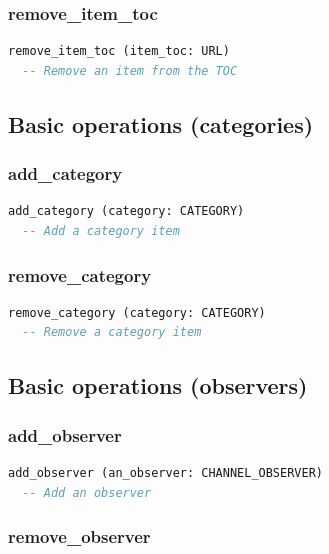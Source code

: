 \subsubsection{remove\_item\_toc}

\begin{lstlisting}[language=Eiffel]
remove_item_toc (item_toc: URL)
  -- Remove an item from the TOC
\end{lstlisting}

\subsection{Basic operations (categories)}
\label{sec:channel-basic-operations-categories}

\subsubsection{add\_category}

\begin{lstlisting}[language=Eiffel]
add_category (category: CATEGORY)
  -- Add a category item
\end{lstlisting}

\subsubsection{remove\_category}

\begin{lstlisting}[language=Eiffel]
remove_category (category: CATEGORY)
  -- Remove a category item
\end{lstlisting}

\subsection{Basic operations (observers)}
\label{sec:channel-basic-operations-observer}

\subsubsection{add\_observer}

\begin{lstlisting}[language=Eiffel]
add_observer (an_observer: CHANNEL_OBSERVER)
  -- Add an observer
\end{lstlisting}

\subsubsection{remove\_observer}

